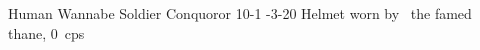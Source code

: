 \filledCS%
  {\currentName}%
  {Human}%
  {Wannabe Soldier}%
  {Conquoror}%
  {{1}{0}{-1}}%
  {{-3}{-2}{0}}%
  {%
    \renewcommand\rank{Fodder}
    \renewcommand\characterDebt{100 \glspl{sp}}
    \setcounter{Athletics}{1}
    \setcounter{Cultivation}{1}
    \setcounter{Deceit}{1}
    \setcounter{Performance}{1}
    \setcounter{Melee}{1}
    \setcounter{Brawl}{1}
    \setcounter{Projectiles}{1}
    \longsword
    \partialleather
  }%
  {}%
  {Helmet worn by \composeHumanName\ the famed  \gls{thane}, 0~\glspl{cp}}%

